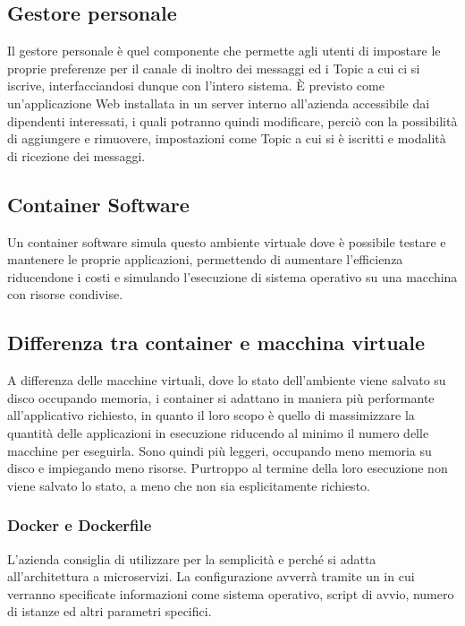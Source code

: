	
	\subsection{Gestore personale}
	Il gestore personale è quel componente che permette agli utenti di impostare le proprie preferenze per il canale di inoltro dei messaggi ed i Topic a cui ci si iscrive, interfacciandosi dunque con l'intero sistema.
	È previsto come un'applicazione Web installata in un server interno all'azienda accessibile dai dipendenti interessati, i quali potranno quindi modificare, perciò con la possibilità di aggiungere e rimuovere, impostazioni come Topic a cui si è iscritti e modalità di ricezione dei messaggi.
	
	\subsection{Container Software}
	
		Un container software simula questo ambiente virtuale dove è possibile testare e mantenere le proprie applicazioni, permettendo di aumentare l'efficienza riducendone i costi e simulando l'esecuzione di sistema operativo su una macchina con risorse condivise.
		
		\subsection{Differenza tra container e macchina virtuale}
		A differenza delle macchine virtuali, dove lo stato dell'ambiente viene salvato su disco occupando memoria, i container si adattano in maniera più performante all'applicativo richiesto, in quanto il loro scopo è quello di massimizzare la quantità delle applicazioni in esecuzione riducendo al minimo il numero delle macchine per eseguirla.
		Sono quindi più leggeri, occupando meno memoria su disco e impiegando meno risorse. Purtroppo al termine della loro esecuzione non viene salvato lo stato, a meno che non sia esplicitamente richiesto.
		
		\subsubsection{Docker e Dockerfile}
		L'azienda consiglia di utilizzare  per la semplicità e perché si adatta all'architettura a microservizi.
		La configurazione avverrà tramite un  in cui verranno specificate informazioni come sistema operativo, script di avvio, numero di istanze ed altri parametri specifici.
